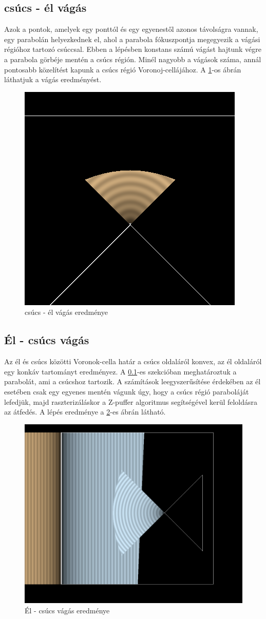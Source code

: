 \subsection{csúcs - él vágás} \label{vertex_segment_cut}
Azok a pontok, amelyek egy ponttól és egy egyenestől azonos távolságra vannak, egy parabolán helyezkednek el, ahol a parabola fókuszpontja megegyezik a vágási régióhoz tartozó csúccsal. Ebben a lépésben konstans számú vágást hajtunk végre a parabola görbéje mentén a csúcs régión. Minél nagyobb a vágások száma, annál pontosabb közelítést kapunk a csúcs régió Voronoj-cellájához. A \ref{fig:vertex_segment_cut-1}-os ábrán láthatjuk a vágás eredményést.

\begin{figure}[H]
    \centering
    \includegraphics[width=.55\linewidth]{images/vertex_segment_cut.png}
    \caption{csúcs - él vágás eredménye}
    \label{fig:vertex_segment_cut-1}
\end{figure}

\subsection{Él - csúcs vágás}
Az él és csúcs közötti Voronok-cella határ a csúcs oldaláról konvex, az él oldaláról egy konkáv tartományt eredményez. A \ref{vertex_segment_cut}-es szekcióban meghatároztuk a parabolát, ami a csúcshoz tartozik. A számítások leegyszerűsítése érdekében az él esetében csak egy egyenes mentén vágunk úgy, hogy a csúcs régió paraboláját lefedjük, majd raszterizáláskor a Z-puffer algoritmus segítségével kerül feloldásra az átfedés. A lépés eredménye a \ref{fig:segment_vertex_cut-1}-es ábrán látható.

\begin{figure}[H]
    \centering
    \includegraphics[width=.55\linewidth]{images/segment_vertex_cut.png}
    \caption{Él - csúcs vágás eredménye}
    \label{fig:segment_vertex_cut-1}
\end{figure}


